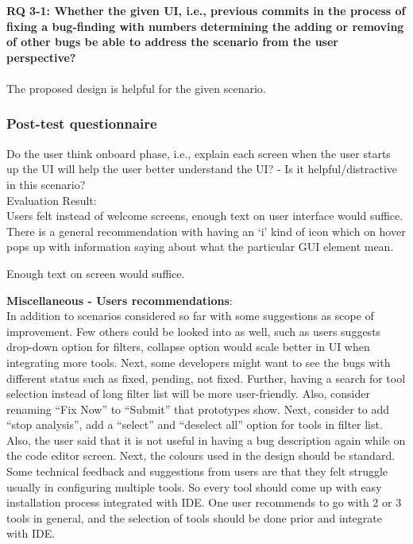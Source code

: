 \begin{myboxi}{\textbf{RQ 3-1: Whether the given UI, i.e., previous commits in the process of fixing a bug-finding with numbers determining the adding or removing of other bugs be able to address the scenario from the user perspective?}}
\\ \\ The proposed design is helpful for the given scenario.
\end{myboxi}


\subsubsection{Post-test questionnaire}

Do the user think onboard phase, i.e., explain each screen when the user starts up the UI will help the user better understand the UI? - Is it helpful/distractive in this scenario? \\

Evaluation Result: \\

Users felt instead of welcome screens, enough text on user interface would suffice. There is a general recommendation with having an ‘i’ kind of icon which on hover pops up with information saying about what the particular GUI element mean. \\

\begin{myboxi}
	Enough text on screen would suffice.
\end{myboxi}
\hfill \break
\textbf{Miscellaneous - Users recommendations}: \\

In addition to scenarios considered so far with some suggestions as scope of improvement. Few others could be looked into as well, such as users suggests drop-down option for filters, collapse option would scale better in UI when integrating more tools. Next, some developers might want to see the bugs with different status such as fixed, pending, not fixed. Further, having a search for tool selection instead of long filter list will be more user-friendly. Also, consider renaming “Fix Now” to “Submit” that prototypes show. Next, consider to add “stop analysis”, add a “select” and “deselect all” option for tools in filter list. Also, the user said that it is not useful in having a bug description again while on the code editor screen. Next, the colours used in the design should be standard. Some technical feedback and suggestions from users are that they felt struggle usually in configuring multiple tools. So every tool should come up with easy installation process integrated with IDE. One user recommends to go with 2 or 3 tools in general, and the selection of tools should be done prior and integrate with IDE.

